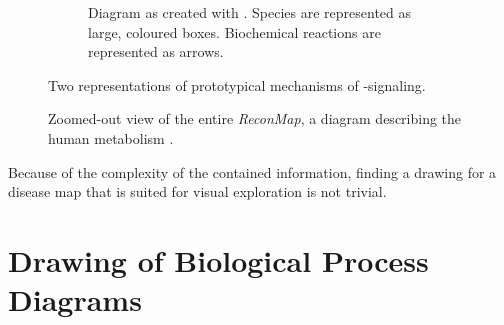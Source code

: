 \documentclass[
	fontsize=10pt, %
	twoside=false, %
	secnumdepth=1, %
  toc=indentunnumbered %
]{kaobook}
\begin{document}
\begin{figure}[h]
\begin{subfigure}{0.4\textwidth}
    \caption{Diagram as created with . Species are
      represented as large, coloured boxes. Biochemical reactions are
      represented as arrows. }
    \label{fig:process-diagram-old-vs-new:celldesigner}
  \end{subfigure}
  \caption{
    Two representations of prototypical mechanisms of \nfkb{}-signaling.
  }
  \label{fig:process-diagram-old-vs-new}
\end{figure}

\begin{figure}[h]
  \centering
  \caption[Screenshot of the \textit{ReconMap}]{Zoomed-out view of the entire \textit{ReconMap}, a
    diagram describing the human metabolism
    \cite{noronha_ReconMapInteractiveVisualization_2017}.}
  \label{fig:disease-map-example}
\end{figure}

Because of the complexity of the contained information, finding a drawing for a
disease map that is suited for visual exploration is not trivial.


\section{Drawing of Biological Process Diagrams}
\label{sec:draw-biol-netw}
\end{document}
